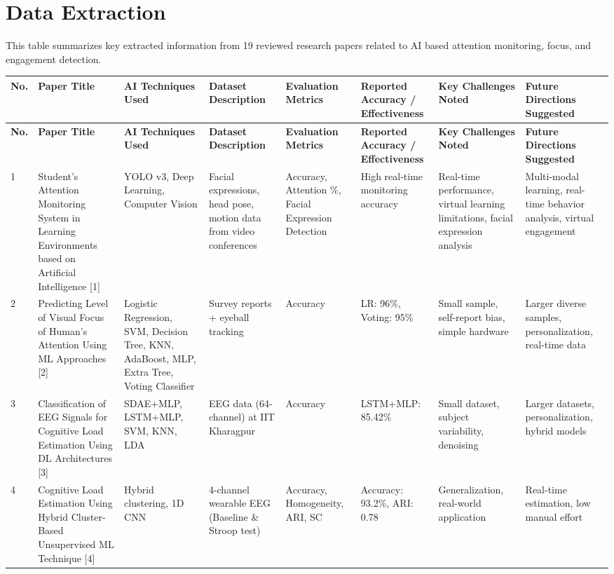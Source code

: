 \documentclass[12pt]{article}
\begin{document}
\section{Data Extraction}
This table summarizes key extracted information from 19 reviewed research papers related to AI based attention monitoring, focus, and engagement detection.
\begin{longtable}{|p{}|p{}|p{}|p{}|p{}|p{}|p{}|p{}|}
\hline
\textbf{No.} & \textbf{Paper Title} & \textbf{AI Techniques Used} & \textbf{Dataset Description} & \textbf{Evaluation Metrics} & \textbf{Reported Accuracy / Effectiveness} & \textbf{Key Challenges Noted} & \textbf{Future Directions Suggested} \\
\hline
\endfirsthead
\hline
\textbf{No.} & \textbf{Paper Title} & \textbf{AI Techniques Used} & \textbf{Dataset Description} & \textbf{Evaluation Metrics} & \textbf{Reported Accuracy / Effectiveness} & \textbf{Key Challenges Noted} & \textbf{Future Directions Suggested} \\
\hline
\endhead
1 & Student’s Attention Monitoring System in Learning Environments based on Artificial Intelligence [1] & YOLO v3, Deep Learning, Computer Vision & Facial expressions, head pose, motion data from video conferences & Accuracy, Attention \%, Facial Expression Detection & High real-time monitoring accuracy & Real-time performance, virtual learning limitations, facial expression analysis & Multi-modal learning, real-time behavior analysis, virtual engagement \\
\hline
2 & Predicting Level of Visual Focus of Human’s Attention Using ML Approaches [2] & Logistic Regression, SVM, Decision Tree, KNN, AdaBoost, MLP, Extra Tree, Voting Classifier & Survey reports + eyeball tracking & Accuracy & LR: 96\%, Voting: 95\% & Small sample, self-report bias, simple hardware & Larger diverse samples, personalization, real-time data \\
\hline
3 & Classification of EEG Signals for Cognitive Load Estimation Using DL Architectures [3] & SDAE+MLP, LSTM+MLP, SVM, KNN, LDA & EEG data (64-channel) at IIT Kharagpur & Accuracy & LSTM+MLP: 85.42\% & Small dataset, subject variability, denoising & Larger datasets, personalization, hybrid models \\
\hline
4 & Cognitive Load Estimation Using Hybrid Cluster-Based Unsupervised ML Technique [4] & Hybrid clustering, 1D CNN & 4-channel wearable EEG (Baseline \& Stroop test) & Accuracy, Homogeneity, ARI, SC & Accuracy: 93.2\%, ARI: 0.78 & Generalization, real-world application & Real-time estimation, low manual effort \\

\end{longtable}
\end{document}
